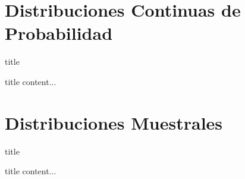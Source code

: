 \documentclass[11pt]{beamer}
\begin{document}
    \section*{Distribuciones Continuas de Probabilidad}
    \begin{frame}{title}
        \begin{block}{title}
            content...
        \end{block}
    \end{frame}



    \section*{Distribuciones Muestrales}
    \begin{frame}{title}
        \begin{block}{title}
            content...
        \end{block}
    \end{frame}
\end{document}
